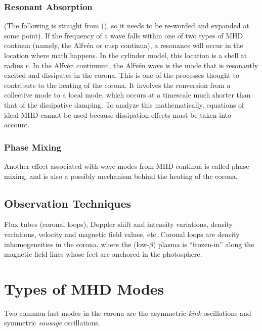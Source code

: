 \documentclass[preprint2]{aastex}
\begin{document}
\subsubsection{Resonant Absorption}
(The following is straight from (\cite{Nak}), so it needs to be
re-worded and expanded at some point).
If the frequency of a wave falls within one of two types of MHD
continua (namely, the Alfv\'en or cusp continua), a resonance will
occur in the location where math happens.
In the cylinder model, this location is a shell at radius $r$.
In the Alfv\'en continuum, the Alfv\'en wave is the mode that is
resonantly excited and dissipates in the corona.
This is one of the processes thought to contribute to the heating
of the corona. It involves the conversion from a collective mode
to a local mode, which occurs at a timescale much shorter than that
of the dissipative damping.
To analyze this mathematically, equations of ideal MHD cannot be used
because dissipation effects must be taken into account.
\subsubsection{Phase Mixing}
Another effect associated with wave modes from MHD continua is called
phase mixing, and is also a possibly mechanism behind the heating of
the corona.
\subsection{Observation Techniques}
Flux tubes (coronal loops), Doppler shift and intensity variations,
density variations, velocity and magnetic field values,
etc. Coronal loops are density inhomogeneities in the corona,
where the (low-$\beta$) plasma is ``frozen-in'' along the magnetic
field lines whose feet are anchored in the photosphere.
\section{Types of MHD Modes}\label{topics}
Two common fast modes in the corona are the asymmetric \emph{kink}
oscillations and symmetric \emph{sausage} oscillations.
\end{document}
